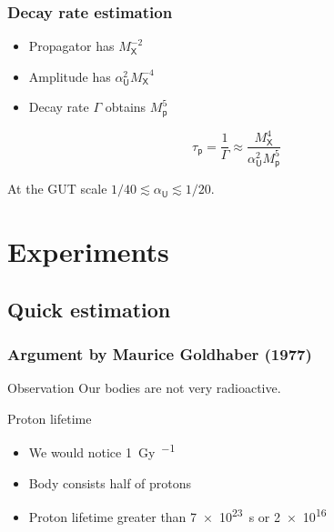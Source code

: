 \documentclass[english, fleqn]{beamer}
\begin{document}
\begin{frame}
    \frametitle{Decay rate estimation}

    \begin{itemize}
        \item Propagator has $M_\mathsf X^{-2}$
        \item Amplitude has $\alpha_\mathsf U^2 M_\mathsf X^{-4}$
        \item Decay rate $\Gamma$ obtains $M_\mathsf p^5$
    \end{itemize}

    \[
        \tau_\mathsf p = \frac{1}{\Gamma} \approx \frac{M_\mathsf X^4}{\alpha_\mathsf U^2 M_\mathsf p^5}
    \]

    At the GUT scale $1/40 \lesssim \alpha_\mathsf U \lesssim 1/20$.

    \parencite{pse/estimate_mass}
\end{frame}


\section{Experiments}

\subsection{Quick estimation}

\begin{frame}
    \frametitle{Argument by Maurice Goldhaber (1977)}
    \begin{block}{Observation}
        Our bodies are not very radioactive.
    \end{block}

    \pause

    \begin{block}{Proton lifetime}
        \begin{itemize}
            \item We would notice \SI{1}{\gray\per\year}
            \item Body consists half of protons
            \item Proton lifetime greater than \SI{7e23}{\second} or \SI{2e16}{\year}
        \end{itemize}
    \end{block}

    \parencite{wikipedia/groessenordnung-aequivalentdosis}
    \parencite{Murayama/Matter_Instability}
\end{frame}
\end{document}
